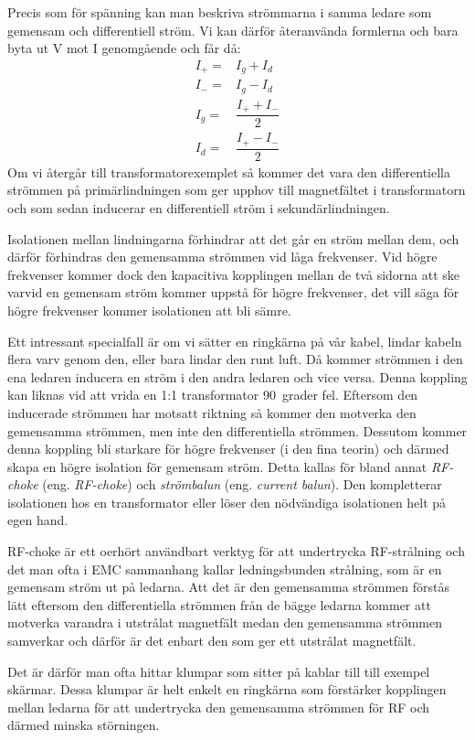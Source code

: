 Precis som för spänning kan man beskriva strömmarna i samma ledare som
gemensam och differentiell ström.
Vi kan därför återanvända formlerna och bara byta ut V mot I genomgående och
får då:
\begin{eqnarray*}
I_+ = & I_g + I_d\\
I_- = & I_g - I_d\\
I_g = & \dfrac{I_+ + I_-}{2}\\
I_d = & \dfrac{I_+ - I_-}{2}
\end{eqnarray*}
Om vi återgår till transformatorexemplet så kommer det vara den differentiella
strömmen på primärlindningen som ger upphov till magnetfältet i transformatorn
och som sedan inducerar en differentiell ström i sekundärlindningen.

Isolationen mellan lindningarna förhindrar att det går en ström mellan dem,
och därför förhindras den gemensamma strömmen vid låga frekvenser.
Vid högre frekvenser kommer dock den kapacitiva kopplingen mellan de två
sidorna att ske varvid en gemensam ström kommer uppstå för högre frekvenser,
det vill säga för högre frekvenser kommer isolationen att bli sämre.

Ett intressant specialfall är om vi sätter en ringkärna på vår kabel, lindar
kabeln flera varv genom den, eller bara lindar den runt luft.
Då kommer strömmen i den ena ledaren inducera en ström i den andra ledaren och
vice versa.
Denna koppling kan liknas vid att vrida en 1:1 transformator 90~grader fel.
Eftersom den inducerade strömmen har motsatt riktning så kommer den motverka
den gemensamma strömmen, men inte den differentiella strömmen. Dessutom kommer
denna koppling bli starkare för högre frekvenser (i den fina teorin) och
därmed skapa en högre isolation för gemensam ström.
Detta kallas för bland annat \emph{RF-choke} (eng. \emph{RF-choke}) och
\emph{strömbalun} (eng. \emph{current balun}).
Den kompletterar isolationen hos en transformator eller löser den nödvändiga
isolationen helt på egen hand.

RF-choke är ett oerhört användbart verktyg för att undertrycka RF-strålning
och det man ofta i EMC sammanhang kallar ledningsbunden strålning, som är en
gemensam ström ut på ledarna.
Att det är den gemensamma strömmen förstås lätt eftersom den differentiella
strömmen från de bägge ledarna kommer att motverka varandra i utstrålat
magnetfält medan den gemensamma strömmen samverkar och därför är det enbart
den som ger ett utstrålat magnetfält.

Det är därför man ofta hittar klumpar som sitter på kablar till till exempel skärmar.
Dessa klumpar är helt enkelt en ringkärna som förstärker kopplingen mellan
ledarna för att undertrycka den gemensamma strömmen för RF och därmed minska
störningen.

